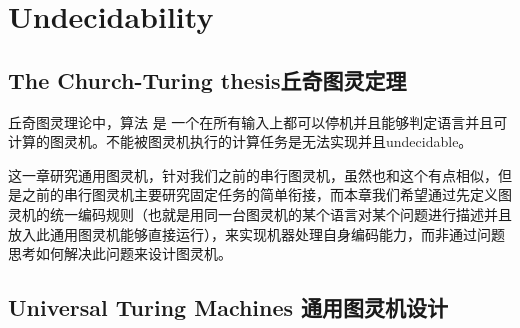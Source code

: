 \documentclass[UTF8]{ctexart}
\begin{document}
\section{Undecidability}
\subsection{The Church-Turing thesis丘奇图灵定理}

丘奇图灵理论中，算法 是 一个在所有输入上都可以停机并且能够判定语言并且可计算的图灵机。不能被图灵机执行的计算任务是无法实现并且undecidable。

这一章研究通用图灵机，针对我们之前的串行图灵机，虽然也和这个有点相似，但是之前的串行图灵机主要研究固定任务的简单衔接，而本章我们希望通过先定义图灵机的统一编码规则（也就是用同一台图灵机的某个语言对某个问题进行描述并且放入此通用图灵机能够直接运行），来实现机器处理自身编码能力，而非通过问题思考如何解决此问题来设计图灵机。

\subsection{Universal Turing Machines 通用图灵机设计}
\end{document}
